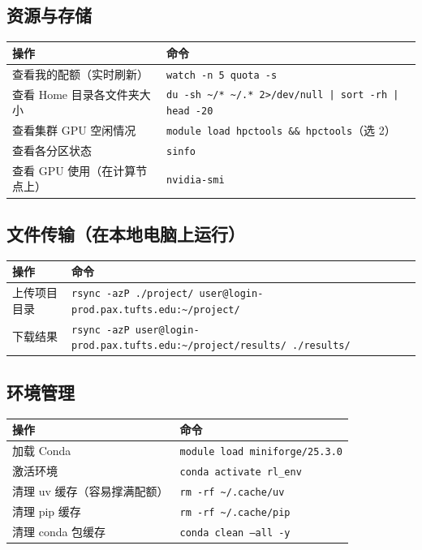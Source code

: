 \subsection*{资源与存储}

\begin{table}[h]
\centering
\small
\begin{tabular}{lp{9cm}}
\toprule
操作 & 命令 \\
\midrule
查看我的配额（实时刷新） & \texttt{watch -n 5 quota -s} \\
查看 Home 目录各文件夹大小 & \texttt{du -sh \textasciitilde/* \textasciitilde/.* 2>/dev/null | sort -rh | head -20} \\
查看集群 GPU 空闲情况 & \texttt{module load hpctools \&\& hpctools}（选 2） \\
查看各分区状态 & \texttt{sinfo} \\
查看 GPU 使用（在计算节点上） & \texttt{nvidia-smi} \\
\bottomrule
\end{tabular}
\end{table}

\subsection*{文件传输（在本地电脑上运行）}

\begin{table}[h]
\centering
\small
\begin{tabular}{lp{9cm}}
\toprule
操作 & 命令 \\
\midrule
上传项目目录 & \texttt{rsync -azP ./project/ user@login-prod.pax.tufts.edu:\textasciitilde/project/} \\
下载结果 & \texttt{rsync -azP user@login-prod.pax.tufts.edu:\textasciitilde/project/results/ ./results/} \\
\bottomrule
\end{tabular}
\end{table}

\subsection*{环境管理}

\begin{table}[h]
\centering
\small
\begin{tabular}{lp{9cm}}
\toprule
操作 & 命令 \\
\midrule
加载 Conda & \texttt{module load miniforge/25.3.0} \\
激活环境 & \texttt{conda activate rl\_env} \\
清理 uv 缓存（容易撑满配额） & \texttt{rm -rf \textasciitilde/.cache/uv} \\
清理 pip 缓存 & \texttt{rm -rf \textasciitilde/.cache/pip} \\
清理 conda 包缓存 & \texttt{conda clean --all -y} \\
\bottomrule
\end{tabular}
\end{table}

\newpage
